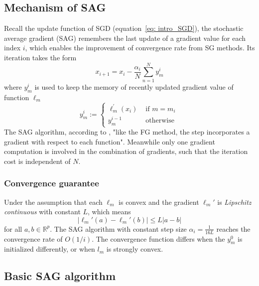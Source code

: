 \subsection{Mechanism of SAG}
Recall the update function of SGD (equation~\ref{eq: intro_SGD}), the stochastic average gradient (SAG) remembers the last update of a gradient value for each index $i$, which enables the improvement of convergence rate from SG methods. Its iteration takes the form
\begin{equation}
x_{i+1} = x_i - \frac{\alpha_i}{N} \sum^N_{n=1}y_{m}^{i}
\end{equation}
where $y_{m}^{i}$ is used to keep the memory of recently updated gradient value of function $\ell_m$
\begin{equation}
y_{m}^{i}:=\left\{\begin{array}{ll}
    \ell_{m}^{\prime}\left(x_{i}\right) & \text { if } m=m_{i} \\
    y_{m}^{i-1} & \text { otherwise }
    \end{array}\right.
\end{equation}
The SAG algorithm, according to \citeauthor{schmidtMinimizingFiniteSums2016}, "like the FG method, the step incorporates a gradient with respect to each function". Meanwhile only one gradient computation is involved in the combination of gradients, such that the iteration cost is independent of $N$.

\subsubsection{Convergence guarantee}

Under the assumption that each $\ell_m$ is convex and the gradient $\ell_m\prime$ is \textit{Lipschitz continuous} with constant $L$, which means
\begin{equation}
|\ell_m\prime (a) - \ell_m\prime (b)| \leq L|a-b|
\end{equation}
for all $a,b \in \mathbb{R}^p$.
The SAG algorithm with constant step size $\alpha_i = \frac{1}{16L}$ reaches the convergence rate of $O(1/i)$. The convergence function differs when the $y_m^0$ is initialized differently, or when $l_m$ is strongly convex.


\subsection{Basic SAG algorithm}

